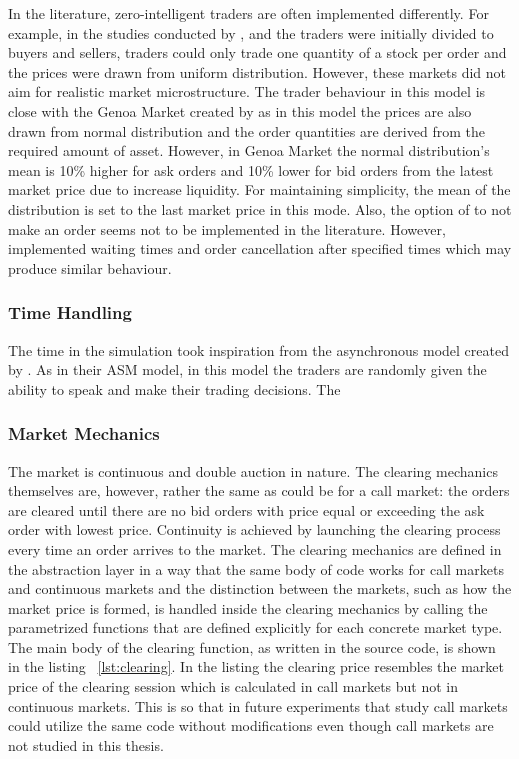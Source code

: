 In the literature, zero-intelligent traders are often implemented differently. For example, in the studies conducted by 
\citet{God93}, \citet{Jam96} and \citet{Mil08} the traders were initially divided to buyers and
sellers, traders could only trade one quantity of a stock per order and the prices
were drawn from uniform distribution. However, these markets did not aim for
realistic market microstructure. The trader behaviour in this model is close with the Genoa Market
created by \citet{Genoa01} as in this model the prices are also drawn from normal distribution and
the order quantities are derived from the required amount of asset. However, in Genoa Market the
normal distribution's mean is 10\% higher for ask orders and 10\% lower for bid orders from the
latest market price due to increase liquidity. For maintaining simplicity, the mean of the distribution
is set to the last market price in this mode. Also, the option of to not make an order seems not to be
implemented in the literature. However, \citet{Raberto05} implemented waiting times and order cancellation
after specified times which may produce similar behaviour. 

\subsubsection{Time Handling}
The time in the simulation took inspiration from the asynchronous model created by \citet{Julien07}. 
As in their ASM model, in this model the traders are randomly given the ability to speak and make 
their trading decisions. The 

\subsubsection{Market Mechanics}

The market is continuous and double auction in nature.
The clearing mechanics themselves are, however, 
rather the same as could be for a call market: 
the orders are cleared until there
are no bid orders with price equal or exceeding the
ask order with lowest price. 
Continuity is achieved by launching the clearing process
every time an order arrives to the market. 
The clearing mechanics are defined in 
the abstraction layer in a way that the same body
of code works for call markets and continuous markets
and the distinction between the markets, such as how 
the market price is formed, is handled inside the clearing
mechanics by calling the parametrized functions that are 
defined explicitly for each concrete market type. 
The main body of the clearing function, 
as written in the source code, is shown in the listing ~\ref{lst:clearing}.
In the listing the clearing price resembles the market price
of the clearing session which is calculated in call markets but not in
continuous markets. This is so that in future experiments
that study call markets could utilize the same code without modifications 
even though call markets are not studied in this thesis.


